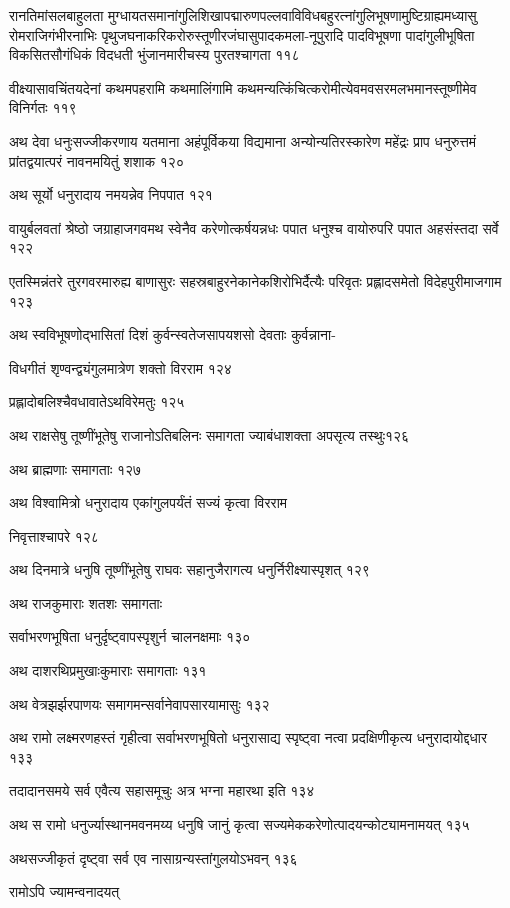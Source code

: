 रानतिमांसलबाहुलता
मुग्धायतसमानांगुलिशिखापद्मारुणपल्लवाविविधबहुरत्नांगुलिभूषणामुष्टिग्राह्यमध्यासु
रोमराजिगंभीरनाभिः पृथुजघनाकरिकरोरुस्तूणीरजंघासुपादकमला-नूपुरादि पादविभूषणा
पादांगुलीभूषिता विकसितसौगंधिकं विदधती भुंजानमारीचस्य पुरतश्चागता ११८

वीक्ष्यासावचिंतयदेनां कथमपहरामि कथमालिंगामि
कथमन्यत्किंचित्करोमीत्येवमवसरमलभमानस्तूष्णीमेव विनिर्गतः ११९

अथ देवा धनुःसज्जीकरणाय यतमाना अहंपूर्विकया विद्यमाना अन्योन्यतिरस्कारेण महेंद्रः प्राप
धनुरुत्तमं प्रांतद्वयात्परं नावनमयितुं शशाक १२०

अथ सूर्यो धनुरादाय नमयन्नेव निपपात १२१

वायुर्बलवतां श्रेष्ठो जग्राहाजगवमथ स्वेनैव करेणोत्कर्षयन्नधः पपात धनुश्च वायोरुपरि पपात
अहसंस्तदा सर्वे १२२

एतस्मिन्नंतरे तुरगवरमारुह्य बाणासुरः सहस्रबाहुरनेकानेकशिरोभिर्दैत्यैः परिवृतः प्रह्लादसमेतो
विदेहपुरीमाजगाम १२३

अथ स्वविभूषणोद्भासितां दिशं कुर्वन्स्वतेजसापयशसो देवताः कुर्वन्नाना-

विधगीतं शृण्वन्द्व्यंगुलमात्रेण शक्तो विरराम १२४

प्रह्लादोबलिश्चैवधावातेऽथविरेमतुः १२५

अथ राक्षसेषु तूष्णींभूतेषु राजानोऽतिबलिनः समागता ज्याबंधाशक्ता अपसृत्य तस्थुः१२६

अथ ब्राह्मणाः समागताः १२७

अथ विश्वामित्रो धनुरादाय एकांगुलपर्यंतं सज्यं कृत्वा विरराम

निवृत्ताश्चापरे १२८

अथ दिनमात्रे धनुषि तूष्णींभूतेषु राघवः सहानुजैरागत्य धनुर्निरीक्ष्यास्पृशत् १२९

अथ राजकुमाराः शतशः समागताः

सर्वाभरणभूषिता धनुर्दृष्ट्वापस्पृशुर्न चालनक्षमाः १३०

अथ दाशरथिप्रमुखाःकुमाराः समागताः १३१

अथ वेत्रझर्झरपाणयः समागमन्सर्वानेवापसारयामासुः १३२

अथ रामो लक्ष्मरणहस्तं गृहीत्वा सर्वाभरणभूषितो धनुरासाद्य स्पृष्ट्वा नत्वा प्रदक्षिणीकृत्य
धनुरादायोद्दधार १३३

तदादानसमये सर्व एवैत्य सहासमूचुः अत्र भग्ना महारथा इति १३४

अथ स रामो धनुर्ज्यास्थानमवनमय्य धनुषि जानुं कृत्वा सज्यमेककरेणोत्पादयन्कोट्यामनामयत् १३५

अथसज्जीकृतं दृष्ट्वा सर्व एव नासाग्रन्यस्तांगुलयोऽभवन् १३६

रामोऽपि ज्यामन्वनादयत्

